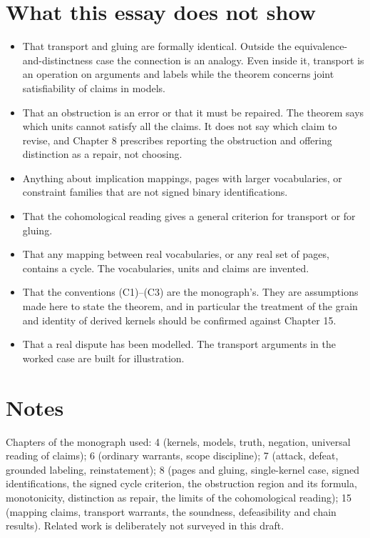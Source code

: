 \documentclass[11pt]{article}
\theoremstyle{plain}
\theoremstyle{definition}
\theoremstyle{remark}
\begin{document}
\section{What this essay does not show}\label{sec:notshown}

\begin{itemize}
\item That transport and gluing are formally identical. Outside the equivalence-and-distinctness case the connection is an analogy. Even inside it, transport is an operation on arguments and labels while the theorem concerns joint satisfiability of claims in models.
\item That an obstruction is an error or that it must be repaired. The theorem says which units cannot satisfy all the claims. It does not say which claim to revise, and Chapter 8 prescribes reporting the obstruction and offering distinction as a repair, not choosing.
\item Anything about implication mappings, pages with larger vocabularies, or constraint families that are not signed binary identifications.
\item That the cohomological reading gives a general criterion for transport or for gluing.
\item That any mapping between real vocabularies, or any real set of pages, contains a cycle. The vocabularies, units and claims are invented.
\item That the conventions (C1)--(C3) are the monograph's. They are assumptions made here to state the theorem, and in particular the treatment of the grain and identity of derived kernels should be confirmed against Chapter 15.
\item That a real dispute has been modelled. The transport arguments in the worked case are built for illustration.
\end{itemize}

\section*{Notes}

Chapters of the monograph used: 4 (kernels, models, truth, negation, universal reading of claims); 6 (ordinary warrants, scope discipline); 7 (attack, defeat, grounded labeling, reinstatement); 8 (pages and gluing, single-kernel case, signed identifications, the signed cycle criterion, the obstruction region and its formula, monotonicity, distinction as repair, the limits of the cohomological reading); 15 (mapping claims, transport warrants, the soundness, defeasibility and chain results). Related work is deliberately not surveyed in this draft.

\end{document}
